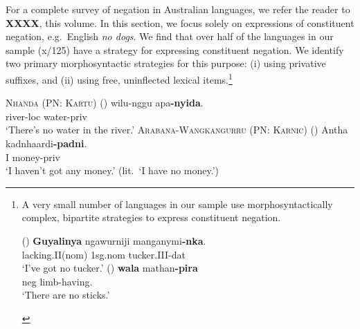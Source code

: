 \documentclass[12pt,egregdoesnotlikesansseriftitles]{scrartcl}
\makeatletter
\newcommand{\ofy}{/125} %
\makeatother
\begin{document}
For a complete survey of negation in Australian languages, we refer the reader to \textbf{XXXX}, this volume. In this section, we focus solely on expressions of constituent negation, e.g.\ English \textit{no dogs}. We find that over half of the languages in our sample (x\ofy) have a strategy for expressing constituent negation.  We identify two primary morphosyntactic  strategies for this purpose: (i) using privative suffixes, and (ii) using free, uninflected lexical items.\footnote{A very small number of languages in our sample use morphosyntactically complex, bipartite strategies to express constituent negation.

\begin{exe}
   \hfill (\citealt[204]{nordlinger98})
  \gll \textbf{Guyalinya}  ngawurniji manganymi\textbf{-nka}.\\
  lacking.II({\sc nom}) 1{\sc sg.nom}  tucker.III-{\sc dat}\\
  \glt `I've got no tucker.'
   \hfill (\citealt[74]{oates88})
  \gll \textbf{wala} mathan\textbf{-pira}\\
  {\sc neg} limb-having.\\
  \glt `There are no sticks.'%
\end{exe}}


\begin{exe}
  \ex \textsc{Nhanda (PN: Kartu)} \hfill (\citealt[64]{blevins01}) \label{privexist1}
  \gll wilu-nggu apa\textbf{-nyida}.\\
  river-{\sc loc} water-{\sc priv}\\
  \glt `There's no water in the river.'
  \ex \textsc{Arabana-Wangkangurru (PN: Karnic)} \hfill (\citealt[237]{hercus94})
  \gll Antha kadnhaardi\textbf{-padni}.\\
  I money-{\sc priv}\\
  \glt `I haven't got any money.' (lit.\ `I have no money.')
 \end{exe}
\end{document}
